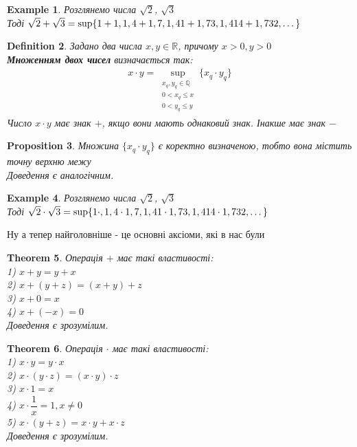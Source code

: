 \documentclass[a4paper, 14pt]{article}
\theoremstyle{theoremdd}
\newtheorem{theorem}{Theorem}[subsection]
\theoremstyle{theoremdd}
\newtheorem{definition}[theorem]{Definition}
\theoremstyle{theoremdd}
\theoremstyle{theoremdd}
\newtheorem{example}[theorem]{Example}
\theoremstyle{theoremdd}
\newtheorem{proposition}[theorem]{Proposition}
\theoremstyle{theoremdd}
\theoremstyle{theoremdd}
\theoremstyle{theoremdd}
\begin{document}
\begin{example} Розглянемо числа $\sqrt{2}$, $\sqrt{3}$\\
Тоді $\sqrt{2} + \sqrt{3} = \huge\sup \{1+1, 1,4+1,7, 1,41+1,73, 1,414+1,732, \dots\}$
\end{example}

\begin{definition}
Задано два числа $x,y \in \mathbb{R}$, причому $x>0,y>0$\\
\textbf{Множенням двох чисел} визначається так:
\begin{align*}
x \cdot y = \sup_{\substack{x_q,y_q \in \mathbb{Q} \\ 0 < x_q \leq x \\ 0 < y_q \leq y}} \{x_q \cdot y_q\}
\end{align*}
Число $x \cdot y$ має знак $+$, якщо вони мають однаковий знак. Інакше має знак $-$
\end{definition}

\begin{proposition}
Множина $\{x_q \cdot y_q\}$ є коректно визначеною, тобто вона містить точну верхню межу\\
\textit{Доведення є аналогічним.}
\end{proposition}

\begin{example} Розглянемо числа $\sqrt{2}$, $\sqrt{3}$\\
Тоді $\sqrt{2} \cdot \sqrt{3} = \huge\sup \{1 \cdot , 1,4 \cdot 1,7, 1,41 \cdot 1,73, 1,414 \cdot 1,732, \dots\}$
\end{example}

Ну а тепер найголовніше - це основні аксіоми, які в нас були

\begin{theorem}
Операція $+$ має такі властивості:\\
1) $x+y = y+x$\\
2) $x+(y+z)=(x+y)+z$\\
3) $x+0 = x$\\
4) $x+(-x) = 0$\\
\textit{Доведення є зрозумілим.}
\end{theorem}

\begin{theorem}
Операція $\cdot$ має такі властивості:\\
1) $x \cdot y = y \cdot x$\\
2) $x \cdot (y \cdot z)=(x \cdot y) \cdot z$\\
3) $x \cdot 1 = x$\\
4) $x \cdot \dfrac{1}{x} = 1, x \neq 0$\\
5) $x \cdot (y+z) = x \cdot y + x \cdot z$\\
\textit{Доведення є зрозумілим.}
\end{theorem}
\end{document}
